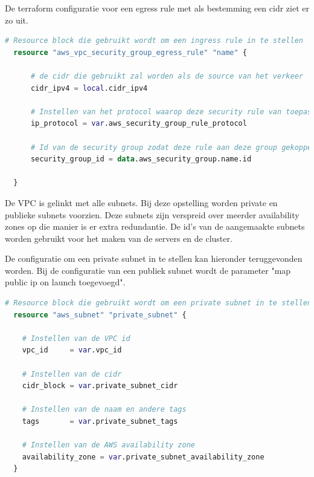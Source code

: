 \vspace{0.5cm}
De terraform configuratie voor een egress rule met als bestemming een cidr ziet er zo uit.
\newline

\begin{lstlisting}[language=terraform]  
  # Resource block die gebruikt wordt om een ingress rule in te stellen
  resource "aws_vpc_security_group_egress_rule" "name" {
  
      # de cidr die gebruikt zal worden als de source van het verkeer
      cidr_ipv4 = local.cidr_ipv4
      
      # Instellen van het protocol waarop deze security rule van toepassing is tcp/udp of -1 voor beide
      ip_protocol = var.aws_security_group_rule_protocol
  
      # Id van de security group zodat deze rule aan deze group gekoppeld kan worden
      security_group_id = data.aws_security_group.name.id
    
  }
\end{lstlisting}

\vspace{0.5cm}
De VPC is gelinkt met alle subnets. Bij deze opstelling worden private en publieke subnets voorzien. Deze subnets zijn verspreid over meerder availability zones op die manier is er extra redundantie. De id's van de aangemaakte subnets worden gebruikt voor het maken van de servers en de cluster.
\newline

De configuratie om een private subnet in te stellen kan hieronder teruggevonden worden. Bij de configuratie van een publiek subnet wordt de parameter "map public ip on launch toegevoegd".
\newline
\begin{lstlisting}[language=terraform]  
  # Resource block die gebruikt wordt om een private subnet in te stellen
  resource "aws_subnet" "private_subnet" {
  
    # Instellen van de VPC id
    vpc_id     = var.vpc_id
  
    # Instellen van de cidr
    cidr_block = var.private_subnet_cidr
  
    # Instellen van de naam en andere tags
    tags       = var.private_subnet_tags
  
    # Instellen van de AWS availability zone
    availability_zone = var.private_subnet_availability_zone
  } 
\end{lstlisting}

